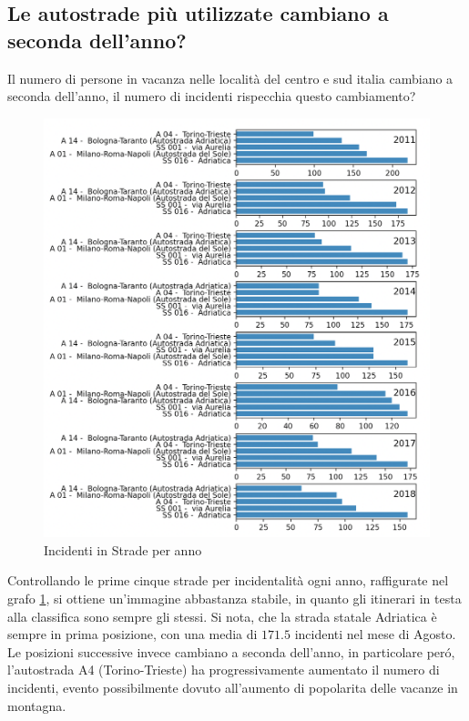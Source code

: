 \documentclass[a4paper]{report}
\begin{document}
\subsection{Le autostrade più utilizzate cambiano a seconda dell'anno?}

Il numero di persone in vacanza nelle località del centro e sud italia cambiano 
a seconda dell'anno, il numero di incidenti rispecchia questo cambiamento?

\begin{figure}
    \includegraphics[width=\linewidth]{../src/incidenti/incidenti_aci/agosto/vacanze_autostrade.png}
    \caption{Incidenti in Strade per anno}
    \label{fig:autostrade-anno}
\end{figure}

Controllando le prime cinque strade per incidentalità ogni anno, 
raffigurate nel grafo \ref{fig:autostrade-anno}, si ottiene un'immagine 
abbastanza stabile, in quanto gli itinerari in testa alla classifica sono sempre gli stessi.
Si nota, che la strada statale Adriatica è sempre in prima posizione, 
con una media di $171.5$ incidenti nel mese di Agosto.
Le posizioni successive invece cambiano a seconda dell'anno, in particolare per\'o, l'autostrada 
A4 (Torino-Trieste) ha progressivamente aumentato il numero di incidenti, evento possibilmente 
dovuto all'aumento di popolarita delle vacanze in montagna.
\end{document}
